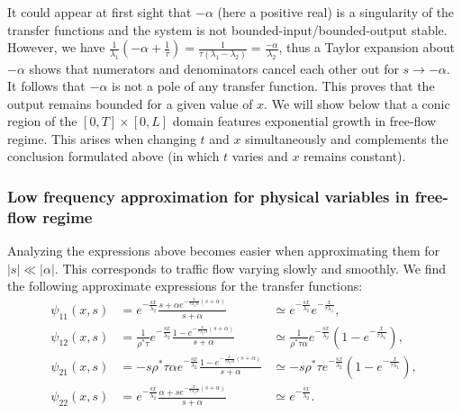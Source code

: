 \documentclass[preprint]{elsarticle}
\begin{document}
It could appear at first sight that $-\alpha$ (here a positive real) is a singularity of the transfer functions and the system is not bounded-input/bounded-output stable. However, we have $\frac{1}{\lambda_{1}}\left(-\alpha+\frac{1}{\tau}\right)=\frac{1}{\tau\left(\lambda_{1} - \lambda_{2}\right)}=\frac{-\alpha}{\lambda_{2}}$, thus a Taylor expansion about $-\alpha$ shows that numerators and denominators cancel each other out for $s \rightarrow -\alpha$. It follows that $-\alpha$ is not a pole of any transfer function. This proves that the output remains bounded for a given value of $x$. We will show below that a conic region of the $\left[0,T\right] \times \left[0,L\right]$ domain features exponential growth in free-flow regime. This arises when changing $t$ and $x$ simultaneously and complements the conclusion formulated above (in which $t$ varies and $x$ remains constant).

\subsubsection{Low frequency approximation for physical variables in free-flow regime}
Analyzing the expressions above becomes easier when approximating them for $\left|s\right|\ll\left|\alpha\right|$. This corresponds to traffic flow varying slowly and smoothly. We find the following approximate expressions for the transfer functions:
\begin{subequations}
\begin{align}
\psi_{11}(x,s) &=
	e^{-\frac{sx}{\lambda_{2}}}
	\frac{
	s + \alpha e^{-\frac{x}{\tau\lambda_{1}\alpha}
		\left(s + \alpha\right)	
		}
	}{
	s + \alpha
	}
&\simeq
e^{-\frac{sx}{\lambda_{2}}}
e^{-\frac{x}{\tau\lambda_{1}}}
, \\
\psi_{12}(x,s) &=
\frac{
	1
}{
	\rho^{*}\tau
}
e^{-\frac{sx}{\lambda_{2}}}
\frac{
	1 - e^{-\frac{x}{\tau\lambda_{1}\alpha}\left(s + \alpha\right)}
}{
	s + \alpha
}
&\simeq
\frac{
	1
}{
	\rho^{*}\tau\alpha
}
e^{-\frac{sx}{\lambda_{2}}}
\left(
	1 - e^{-\frac{x}{\tau\lambda_{1}}}
\right)
, \\
\psi_{21}(x,s) &=
- s \rho^{*} \tau \alpha
e^{-\frac{sx}{\lambda_{2}}}
\frac{
	1 - e^{-\frac{x}{\tau\lambda_{1}\alpha}\left(s + \alpha\right)}
}{
	s + \alpha
}
& \simeq
- s \rho^{*} \tau
e^{-\frac{sx}{\lambda_{2}}}
\left(
	1 - e^{-\frac{x}{\tau\lambda_{1}}}
\right)
, \\
\psi_{22}(x,s) &=
e^{-\frac{sx}{\lambda_{2}}}
\frac{
	\alpha + s e^{-\frac{x}{\tau\lambda_{1}\alpha}\left(s + \alpha\right)}
}{
	s + \alpha
}
&\simeq
e^{-\frac{sx}{\lambda_{2}}}
.
\end{align}
\end{subequations}
\end{document}
